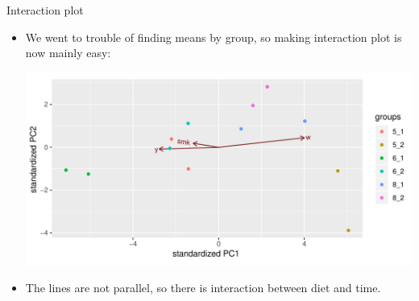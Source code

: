 \begin{frame}[fragile]{Interaction plot}
\begin{itemize}
\item We went to trouble of finding means by group, so making
  interaction plot is now mainly easy:
  
\begin{knitrout}
\color{fgcolor}\begin{kframe}
\begin{alltt}
\hlstd{(}\hlopt{+}
  \hlstd{()}\hlopt{+}\hlstd{()}
\end{alltt}
\end{kframe}
\includegraphics[width=\maxwidth]{figure/unnamed-chunk-24-1} 

\end{knitrout}

\item The lines are not parallel, so there is interaction between diet
  and time.
\end{itemize}
  
\end{frame}
